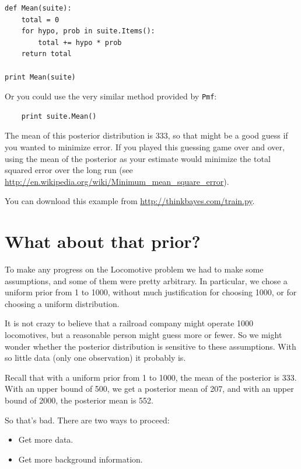 \documentclass[12pt]{book}
\begin{document}
\begin{verbatim}
def Mean(suite): 
    total = 0
    for hypo, prob in suite.Items():
        total += hypo * prob
    return total

print Mean(suite)
\end{verbatim}

Or you could use the very similar method provided by {\tt Pmf}:

\begin{verbatim}
    print suite.Mean()
\end{verbatim}

The mean of this posterior distribution is 333, so that might be a
good guess if you wanted to minimize error.  If you played this
guessing game over and over, using the mean of the posterior as your
estimate would minimize the total squared error over the long run (see
\url{http://en.wikipedia.org/wiki/Minimum_mean_square_error}).

You can download this example from \url{http://thinkbayes.com/train.py}.


\section{What about that prior?}

To make any progress on the Locomotive problem we had to make
some assumptions, and some of them were pretty arbitrary.  In
particular, we chose a uniform prior from 1 to 1000, without
much justification for choosing 1000, or for choosing a uniform
distribution.

It is not crazy to believe that a railroad company might operate
1000 locomotives, but a reasonable person might guess more or fewer.
So we might wonder whether the posterior distribution is sensitive
to these assumptions.  With so little data (only one observation)
it probably is.

Recall that with a uniform prior from 1 to 1000, the mean of
the posterior is 333.  With an upper bound of 500, we get a
posterior mean of 207, and with an upper bound of 2000,
the posterior mean is 552.

So that's bad.  There are two ways to proceed:

\begin{itemize}

\item Get more data.

\item Get more background information.

\end{itemize}
\end{document}
